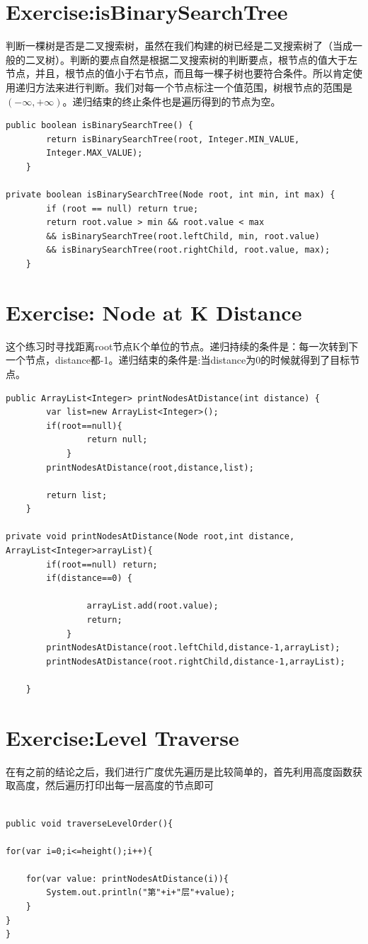 \documentclass[
	11pt,
	fleqn,
	a4paper,
]{LegrandOrangeBook}
\begin{document}
\section{Exercise:isBinarySearchTree}
判断一棵树是否是二叉搜索树，虽然在我们构建的树已经是二叉搜索树了（当成一般的二叉树）。判断的要点自然是根据二叉搜索树的判断要点，根节点的值大于左节点，并且，根节点的值小于右节点，而且每一棵子树也要符合条件。所以肯定使用递归方法来进行判断。我们对每一个节点标注一个值范围，树根节点的范围是$(-\infty,+\infty)$。递归结束的终止条件也是遍历得到的节点为空。
\begin{verbatim}
public boolean isBinarySearchTree() {
        return isBinarySearchTree(root, Integer.MIN_VALUE,
        Integer.MAX_VALUE);
    }

private boolean isBinarySearchTree(Node root, int min, int max) {
        if (root == null) return true;
        return root.value > min && root.value < max
        && isBinarySearchTree(root.leftChild, min, root.value)
        && isBinarySearchTree(root.rightChild, root.value, max);
    }
\end{verbatim}

\section{Exercise: Node at K Distance}
这个练习时寻找距离root节点K个单位的节点。递归持续的条件是：每一次转到下一个节点，distance都-1。递归结束的条件是:当distance为0的时候就得到了目标节点。
\begin{verbatim}
public ArrayList<Integer> printNodesAtDistance(int distance) {
        var list=new ArrayList<Integer>();
        if(root==null){
                return null;
            }
        printNodesAtDistance(root,distance,list);

        return list;
    }

private void printNodesAtDistance(Node root,int distance,
ArrayList<Integer>arrayList){
        if(root==null) return;
        if(distance==0) {

                arrayList.add(root.value);
                return;
            }
        printNodesAtDistance(root.leftChild,distance-1,arrayList);
        printNodesAtDistance(root.rightChild,distance-1,arrayList);

    }
\end{verbatim}
\section{Exercise:Level Traverse}
在有之前的结论之后，我们进行广度优先遍历是比较简单的，首先利用高度函数获取高度，然后遍历打印出每一层高度的节点即可
\begin{verbatim}

public void traverseLevelOrder(){

for(var i=0;i<=height();i++){

    for(var value: printNodesAtDistance(i)){
        System.out.println("第"+i+"层"+value);
    }
}
}
\end{verbatim}
\end{document}
